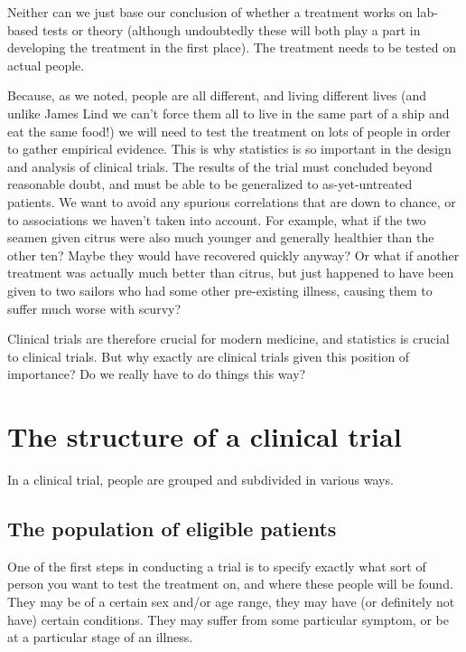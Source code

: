 \documentclass[
  openany]{book}
\theoremstyle{definition}
\theoremstyle{definition}
\theoremstyle{definition}
\theoremstyle{definition}
\theoremstyle{remark}
\begin{document}
Neither can we just base our conclusion of whether a treatment works on lab-based tests or theory (although undoubtedly these will both play a part in developing the treatment in the first place). The treatment needs to be tested on actual people.

Because, as we noted, people are all different, and living different lives (and unlike James Lind we can't force them all to live in the same part of a ship and eat the same food!) we will need to test the treatment on lots of people in order to gather empirical evidence. This is why statistics is so important in the design and analysis of clinical trials. The results of the trial must concluded beyond reasonable doubt, and must be able to be generalized to as-yet-untreated patients. We want to avoid any spurious correlations that are down to chance, or to associations we haven't taken into account. For example, what if the two seamen given citrus were also much younger and generally healthier than the other ten? Maybe they would have recovered quickly anyway? Or what if another treatment was actually much better than citrus, but just happened to have been given to two sailors who had some other pre-existing illness, causing them to suffer much worse with scurvy?

Clinical trials are therefore crucial for modern medicine, and statistics is crucial to clinical trials. But why exactly are clinical trials given this position of importance? Do we really have to do things this way?

\hypertarget{the-structure-of-a-clinical-trial}{%
\section{The structure of a clinical trial}\label{the-structure-of-a-clinical-trial}}

In a clinical trial, people are grouped and subdivided in various ways.

\hypertarget{the-population-of-eligible-patients}{%
\subsection*{The population of eligible patients}\label{the-population-of-eligible-patients}}

One of the first steps in conducting a trial is to specify exactly what sort of person you want to test the treatment on, and where these people will be found. They may be of a certain sex and/or age range, they may have (or definitely not have) certain conditions. They may suffer from some particular symptom, or be at a particular stage of an illness.
\end{document}
